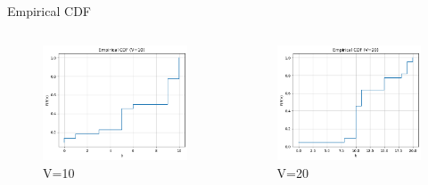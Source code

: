 \documentclass{beamer}
\begin{document}
\begin{frame}{Empirical CDF}
\begin{columns}[T,onlytextwidth]
  \begin{figure}
    \centering
    \includegraphics[width=\linewidth]{332Project1/figures/v=10.png}
    \caption{V=10}\label{fig:v10}
  \end{figure}

  \begin{figure}
    \centering
    \includegraphics[width=\linewidth]{332Project1/figures/v=20.png}
    \caption{V=20}\label{fig:v20}
  \end{figure}


\end{columns}
\end{frame}
\end{document}
